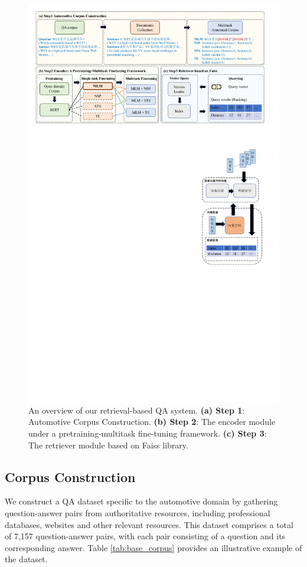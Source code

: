 \documentclass[mathematics,article,submit,moreauthors]{Definitions/mdpi}
\newcommand{\1}[1]{\mathds{1}\left[#1\right]}
\newcommand{\tableref}[1]{Table \ref{#1}}
\begin{document}
\begin{figure}[H]
	\includegraphics[width=14.0cm]{overview}
	\caption{An overview of our retrieval-based QA system. \textbf{(a) Step 1}: Automotive Corpus Construction. \textbf{(b) Step 2}: The encoder module under a pretraining-multitask fine-tuning framework. \textbf{(c) Step 3}: The retriever module based on Faiss library.}
	\label{fig:overview}
\end{figure}   
\unskip

\subsection{Corpus Construction}
\label{sec:corpus_construction}
We construct a QA dataset specific to the automotive domain by gathering question-answer pairs from authoritative resources, including professional databases, websites and other relevant resources. This dataset comprises a total of 7,157 question-answer pairs, with each pair consisting of a question and its corresponding answer. \tableref{tab:base_corpus} provides an illustrative example of the dataset. 
\end{document}
